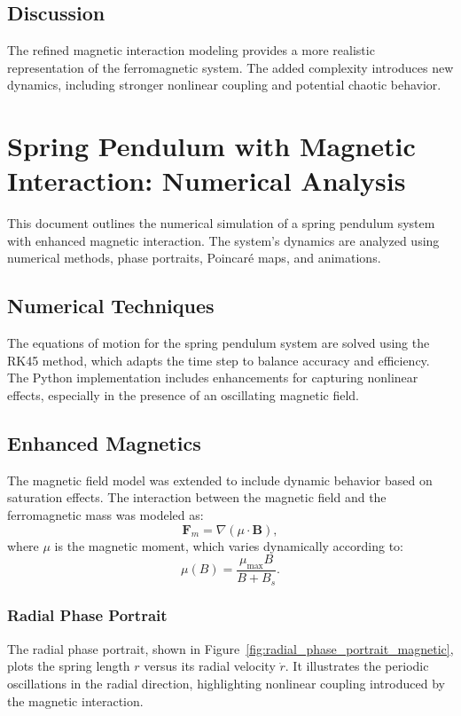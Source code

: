 \documentclass[12pt]{article}
\begin{document}
\subsection{Discussion}
The refined magnetic interaction modeling provides a more realistic representation of the ferromagnetic system. The added complexity introduces new dynamics, including stronger nonlinear coupling and potential chaotic behavior.


\section{Spring Pendulum with Magnetic Interaction: Numerical Analysis}
This document outlines the numerical simulation of a spring pendulum system with enhanced magnetic interaction. The system's dynamics are analyzed using numerical methods, phase portraits, Poincaré maps, and animations.

\subsection{Numerical Techniques}
The equations of motion for the spring pendulum system are solved using the RK45 method, which adapts the time step to balance accuracy and efficiency. The Python implementation includes enhancements for capturing nonlinear effects, especially in the presence of an oscillating magnetic field.

\subsection{Enhanced Magnetics}
The magnetic field model was extended to include dynamic behavior based on saturation effects. The interaction between the magnetic field and the ferromagnetic mass was modeled as:
\[
\mathbf{F}_m = \nabla (\mu \cdot \mathbf{B}),
\]
where \( \mu \) is the magnetic moment, which varies dynamically according to:
\[
\mu(B) = \frac{\mu_{\text{max}} B}{B + B_s}.
\]

\subsubsection{Radial Phase Portrait}
The radial phase portrait, shown in Figure~\ref{fig:radial_phase_portrait_magnetic}, plots the spring length \( r \) versus its radial velocity \( \dot{r} \). It illustrates the periodic oscillations in the radial direction, highlighting nonlinear coupling introduced by the magnetic interaction.
\end{document}
